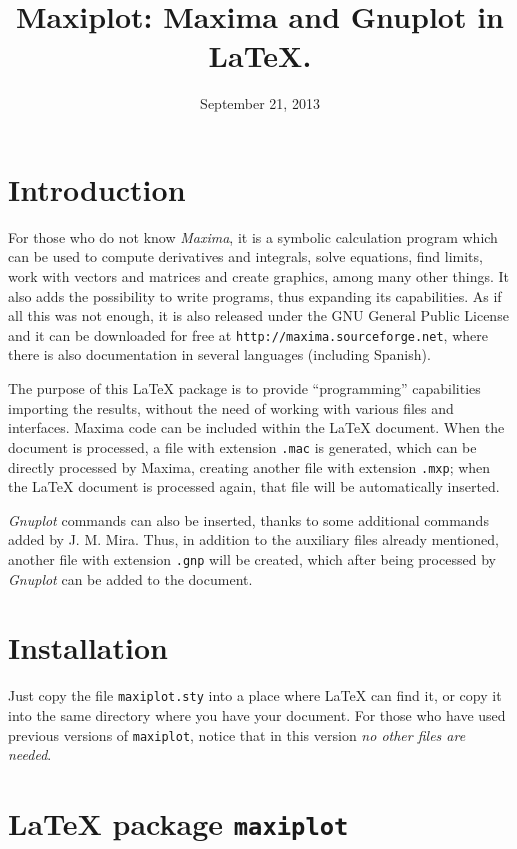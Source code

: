 \documentclass[11pt,a4paper]{article}
\title{Maxiplot: Maxima and Gnuplot in \LaTeX.\\}
\date{September 21, 2013}
\def\Maxima{\emph{Maxima}}
\def\Gnuplot{\emph{Gnuplot}}
\begin{document}
\maketitle

\section{Introduction}
For those who do not know \Maxima, it is a symbolic calculation
program which can be used to compute derivatives and integrals, solve
equations, find limits, work with vectors and matrices and create
graphics, among many other things. It also adds the possibility to
write programs, thus expanding its capabilities. As if all this was
not enough, it is also released under the GNU General Public License
and it can be downloaded for free at
\texttt{http://maxima.sourceforge.net}, where there is also
documentation in several languages (including Spanish).

The purpose of this \LaTeX{} package is to provide ``programming''
capabilities importing the results, without the need of working with
various files and interfaces. Maxima code can be included within the
\LaTeX{} document. When the document is processed, a file with
extension \texttt{.mac} is generated, which can be directly processed
by Maxima, creating another file with extension \texttt{.mxp}; when
the \LaTeX{} document is processed again, that file will be
automatically inserted.

\Gnuplot{} commands can also be inserted, thanks to some additional
commands added by J. M. Mira. Thus, in addition to the auxiliary files
already mentioned, another file with extension \texttt{.gnp} will be
created, which after being processed by \Gnuplot{} can be added to the
document.

\section{Installation}

Just copy the file \texttt{maxiplot.sty} into a place where \LaTeX{}
can find it, or copy it into the same directory where you have your
document. For those who have used previous versions of
\texttt{maxiplot}, notice that in this version \emph{no other files are
  needed}.

\section{ \LaTeX{} package \texttt{maxiplot}}
\end{document}
